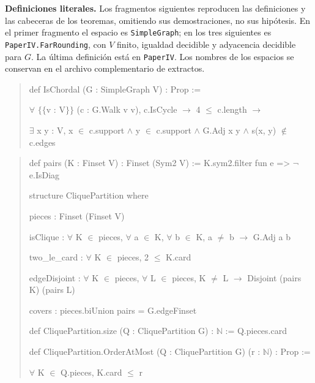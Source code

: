 \documentclass[spanish,11pt,a4paper]{article}
\begin{document}
\textbf{Definiciones literales.} Los fragmentos siguientes reproducen las definiciones y las cabeceras de los teoremas, omitiendo sus demostraciones, no sus hipótesis. En el primer fragmento el espacio es \nolinkurl{SimpleGraph}; en los tres siguientes es \nolinkurl{PaperIV.FarRounding}, con \(V\) finito, igualdad decidible y adyacencia decidible para \(G\). La última definición está en \nolinkurl{PaperIV}. Los nombres de los espacios se conservan en el archivo complementario de extractos.

\begin{quote}\footnotesize\ttfamily\raggedright
def IsChordal (G : SimpleGraph V) : Prop :=\par
  \(\forall\) \(\{\!\{\)v : V\(\}\!\}\) (c : G.Walk v v), c.IsCycle \(\to\) 4 \(\le\) c.length \(\to\)\par
    \(\exists\) x y : V, x \(\in\) c.support \(\land\) y \(\in\) c.support \(\land\) G.Adj x y \(\land\) s(x, y) \(\notin\) c.edges\par
\end{quote}

\begin{quote}\footnotesize\ttfamily\raggedright
def pairs (K : Finset V) : Finset (Sym2 V) := K.sym2.filter fun e => \(\neg\) e.IsDiag\par
\par
structure CliquePartition where\par
  pieces : Finset (Finset V)\par
  isClique : \(\forall\) K \(\in\) pieces, \(\forall\) a \(\in\) K, \(\forall\) b \(\in\) K, a \(\ne\) b \(\to\) G.Adj a b\par
  two\_le\_card : \(\forall\) K \(\in\) pieces, 2 \(\le\) K.card\par
  edgeDisjoint : \(\forall\) K \(\in\) pieces, \(\forall\) L \(\in\) pieces, K \(\ne\) L \(\to\) Disjoint (pairs K) (pairs L)\par
  covers : pieces.biUnion pairs = G.edgeFinset\par
\par
def CliquePartition.size (Q : CliquePartition G) : \(\mathbb N\) := Q.pieces.card\par
\par
def CliquePartition.OrderAtMost (Q : CliquePartition G) (r : \(\mathbb N\)) : Prop :=\par
  \(\forall\) K \(\in\) Q.pieces, K.card \(\le\) r\par
\end{quote}
\end{document}
